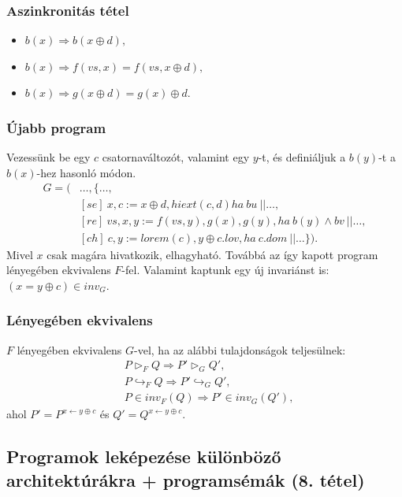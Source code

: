\documentclass[12pt]{article}
\begin{document}
	\subsubsection{Aszinkronitás tétel}
	\begin{itemize}
		\item $b(x) \Rightarrow b(x \oplus d),$
		\item $b(x) \Rightarrow f(vs, x) = f(vs, x \oplus d),$
		\item $b(x) \Rightarrow g(x \oplus d) = g(x) \oplus d.$
	\end{itemize}
	
	\subsubsection{Újabb program}
	Vezessünk be egy $c$ csatornaváltozót, valamint egy $y$-t, és definiáljuk a $b(y)$-t a $b(x)$-hez hasonló módon.
	\begin{align*}
	G = ( &\dots, \{ \dots, \\
	&[se]\ x, c := x \oplus d, hiext(c, d) ha\ bu\ || \dots, \\
	&[re]\ vs, x, y := f(vs, y), g(x), g(y), ha\ b(y) \land bv\ || \dots, \\
	&[ch]\ c, y := lorem(c), y \oplus c.lov, ha\ c.dom\ || \dots\}).
	\end{align*}
	Mivel $x$ csak magára hivatkozik, elhagyható. Továbbá az így kapott program lényegében ekvivalens $F$-fel. Valamint kaptunk egy új invariánst is: $(x = y \oplus c) \in inv_G$.
	
	\subsubsection{Lényegében ekvivalens}
	$F$ lényegében ekvivalens $G$-vel, ha az alábbi tulajdonságok teljesülnek:
	\begin{align*}
	& P \vartriangleright_F Q \Rightarrow P' \vartriangleright_G Q', \\
	& P \hookrightarrow_F Q \Rightarrow P' \hookrightarrow_G Q', \\
	& P \in inv_F(Q) \Rightarrow P' \in inv_G(Q'),
	\end{align*}
	ahol $P' = P^{x \leftarrow y \oplus c}$ és $Q' = Q^{x \leftarrow y \oplus c}$.
	
	
	
	\subsection{Programok leképezése különböző architektúrákra + programsémák (8. tétel)}
	
\end{document}
